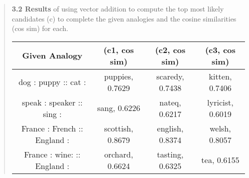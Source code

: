 \begin{quote}
    {\bf 3.2 Results} of using vector addition to compute the top most likely candidates (c) to complete the given analogies and the cosine similarities (cos sim) for each.
    \begin{center}
	\begin{tabular}{ c | c | c | c } 
	    Given Analogy & (c1, cos sim) & (c2, cos sim) & (c3, cos sim) \\
	    \hline
	    dog : puppy :: cat : & puppies, 0.7629 & scaredy, 0.7438 & kitten, 0.7406 \\
	    speak : speaker :: sing : & sang, 0.6226 & nateq, 0.6217 & lyricist, 0.6019 \\
	    France : French :: England : & scottish, 0.8679 & english, 0.8374 & welsh, 0.8057 \\
	    France : wine: :: England : & orchard, 0.6624 & tasting, 0.6325 & tea, 0.6155
	\end{tabular}
    \end{center} 
\end{quote}

